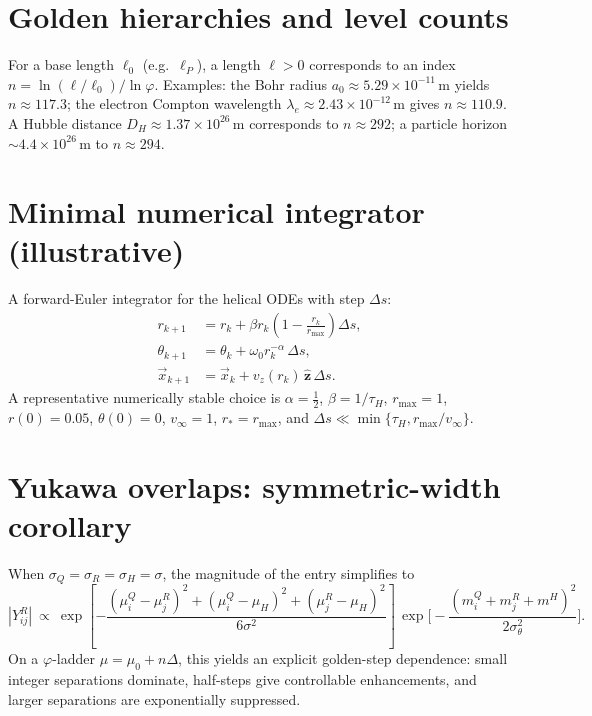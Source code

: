 \documentclass[11pt]{article}
\begin{document}
\section{Golden hierarchies and level counts}
For a base length \(\ell_0\) (e.g.\ \(\ell_P\)), a length \(\ell>0\) corresponds to an index \(n=\ln(\ell/\ell_0)/\ln\varphi\).
Examples: the Bohr radius \(a_0\approx 5.29\times 10^{-11}\,\mathrm{m}\) yields \(n\approx 117.3\); the electron Compton wavelength \(\lambda_e\approx 2.43\times 10^{-12}\,\mathrm{m}\) gives \(n\approx 110.9\).
A Hubble distance \(D_H\approx 1.37\times 10^{26}\,\mathrm{m}\) corresponds to \(n\approx 292\); a particle horizon \(\sim 4.4\times 10^{26}\,\mathrm{m}\) to \(n\approx 294\).

\section{Minimal numerical integrator (illustrative)}
A forward-Euler integrator for the helical ODEs with step \(\Delta s\):
\begin{align*}
r_{k+1} &= r_k + \beta r_k\!\left(1-\frac{r_k}{r_{\max}}\right)\Delta s,\\
\theta_{k+1} &= \theta_k + \omega_0 r_k^{-\alpha}\,\Delta s,\\
\vec x_{k+1} &= \vec x_k + v_z(r_k)\,\hat{\mathbf z}\,\Delta s.
\end{align*}
A representative numerically stable choice is \(\alpha=\tfrac{1}{2}\), \(\beta=1/\tau_H\), \(r_{\max}=1\), \(r(0)=0.05\), \(\theta(0)=0\), \(v_\infty=1\), \(r_*=r_{\max}\), and \(\Delta s\ll\min\{\tau_H, r_{\max}/v_\infty\}\).

\section{Yukawa overlaps: symmetric-width corollary}
When \(\sigma_Q=\sigma_R=\sigma_H=\sigma\), the magnitude of the entry simplifies to
\begin{equation}
|Y^R_{ij}|\ \propto\ \exp\!\left[-\frac{(\mu^Q_i-\mu^R_j)^2+(\mu^Q_i-\mu_H)^2+(\mu^R_j-\mu_H)^2}{6\sigma^2}\right]\,
\exp\!\Big[-\frac{(m^Q_i+m^R_j+m^H)^2}{2\sigma_\theta^2}\Big].
\end{equation}
On a \(\varphi\)-ladder \(\mu=\mu_0+n\Delta\), this yields an explicit golden-step dependence: small integer separations dominate, half-steps give controllable enhancements, and larger separations are exponentially suppressed.


\end{document}
